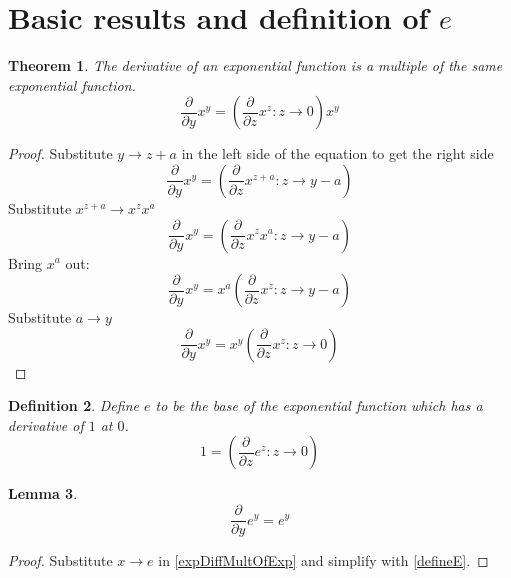 \documentclass[]{article}
\newcommand{\pqty}[1]{{\left(#1\right)}}
\newcommand{\pdiff}[2]{\frac{\partial^{#2}}{\partial #1^{#2}}}
\newtheorem{theorem}{Theorem}[section]
\newtheorem{lemma}[theorem]{Lemma}
\newtheorem{definition}[theorem]{Definition}
\numberwithin{equation}{section}
\begin{document}
	\section{Basic results and definition of \(e\)}
	\begin{theorem}
		The derivative of an exponential function is a multiple of the same exponential function.
		\begin{equation}
		\pdiff{y}{}x^y=\pqty{\pdiff{z}{}x^z:z\to 0}x^y
		\end{equation}
	\end{theorem}
	\begin{proof}
		Substitute \(y\to z+a\) in the left side of the equation to get the right side
		\begin{equation}
		\pdiff{y}{}x^y=\pqty{\pdiff{z}{}x^{z+a}:z\to y-a}
		\end{equation}
		Substitute \(x^{z+a}\to x^zx^a\)
		\begin{equation}
		\pdiff{y}{}x^y=\pqty{\pdiff{z}{}x^zx^a:z\to y-a}
		\end{equation}
		Bring \(x^a\) out:
		\begin{equation}
		\pdiff{y}{}x^y=x^a\pqty{\pdiff{z}{}x^z:z\to y-a}
		\end{equation}
		Substitute \(a\to y\)
		\begin{equation}
		\label{expDiffMultOfExp}
		\pdiff{y}{}x^y=x^y\pqty{\pdiff{z}{}x^z:z\to 0}
		\end{equation}
	\end{proof}

	\begin{definition}
		Define \(e\) to be the base of the exponential function which has a derivative of \(1\) at \(0\).
		\begin{equation}
		\label{defineE}
			1=\pqty{\pdiff{z}{}e^z:z\to 0}
		\end{equation}
	\end{definition}

	\begin{lemma}
		\begin{equation}
		\label{expOwnDeriv}
		\pdiff{y}{}e^y=e^y
		\end{equation}
	\end{lemma}
	\begin{proof}
		Substitute \(x\to e\) in \eqref{expDiffMultOfExp} and simplify with \eqref{defineE}.
	\end{proof}
\end{document}

